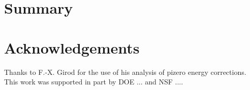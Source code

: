 \section{Summary}

\section{Acknowledgements}

Thanks to F.-X. Girod for the use of his analysis of pizero energy corrections.
This work was supported in part by DOE ... and NSF ....




